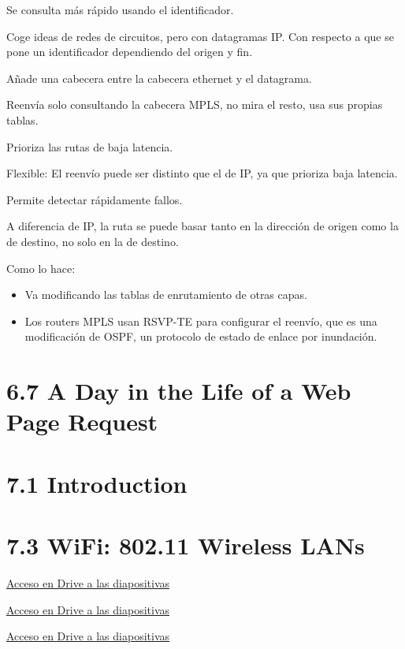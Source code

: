 \documentclass[12pt, twoside, openright]{report} %
\begin{document}
Se consulta más rápido usando el identificador.

Coge ideas de redes de circuitos, pero con datagramas IP. Con
respecto a que se pone un identificador dependiendo del origen y
fin.

Añade una cabecera entre la cabecera ethernet y el datagrama.

Reenvía solo consultando la cabecera MPLS, no mira el resto, usa
sus propias tablas.

Prioriza las rutas de baja latencia.

Flexible: El reenvío puede ser distinto que el de IP, ya que
prioriza baja latencia.

Permite detectar rápidamente fallos.

A diferencia de IP, la ruta se puede basar tanto en la dirección
de origen como la de destino, no solo en la de destino.
\pagebreak

Como lo hace:
\begin{itemize}
	\item Va modificando las tablas de enrutamiento de otras capas.
	\item Los routers MPLS usan RSVP-TE para configurar el reenvío, que es una
	      modificación de OSPF, un protocolo de estado de enlace por
	      inundación.
\end{itemize}

\section{6.7 A Day in the Life of a Web Page Request}

\section{7.1 Introduction}

\section{7.3 WiFi: 802.11 Wireless LANs}

\href{https://drive.google.com/file/d/1A_ompfRwG0UC5bUmhosP19GjYcG3iaNC/view?usp=sharing}{Acceso en Drive a las diapositivas}

\href{https://drive.google.com/file/d/1As8rdI9okS-TyZsHl3f6tj1ZKKItx1kT/view?usp=sharing}{Acceso en Drive a las diapositivas}

\href{https://drive.google.com/file/d/1AYFfY-uZcdAW7zipB4o5x_fc4mfXV6Cq/view?usp=sharing}{Acceso en Drive a las diapositivas}
\end{document}
